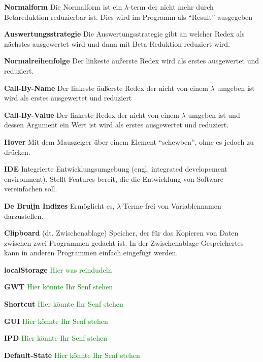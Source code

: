 \documentclass[parskip=full,11pt,twoside]{scrartcl}
\begin{document}
\textbf{Normalform}
\newline
Die Normalform ist ein $\lambda$-term der nicht mehr durch Betareduktion reduzierbar ist. Dies wird im Programm als \enquote{Result} ausgegeben

\textbf{Auswertungsstrategie}
\newline
Die Auswertungsstrategie gibt an welcher Redex als nächstes ausgewertet wird und dann mit Beta-Reduktion reduziert wird.

\textbf{Normalreihenfolge}
\newline
Der linkeste äußerste Redex wird als erstes ausgewertet und reduziert.

\textbf{Call-By-Name}
\newline
Der linkeste äußerste Redex der nicht von einem $\lambda$ umgeben ist wird als erstes ausgewertet und reduziert

\textbf{Call-By-Value}
\newline
Der linkeste Redex der nicht von einem $\lambda$ umgeben ist und dessen Argument ein Wert ist wird als erstes ausgewertet und reduziert.

\textbf{Hover}
\newline
Mit dem Mauszeiger über einem Element \enquote{schewben}, ohne es jedoch zu drücken.

\textbf{IDE}
\newline
Integrierte Entwicklungsumgebung (engl. integrated developement environment). Stellt Features bereit, die die Entwicklung von Software vereinfachen soll.

\textbf{De Bruijn Indizes}
\newline
Ermöglicht es, $\lambda$-Terme frei von Variablennamen darzustellen.

\textbf{Clipboard}
\newline
(dt. Zwischenablage) Speicher, der für das Kopieren von Daten zwischen zwei Programmen gedacht ist. In der Zwischenablage Gespeichertes kann in anderen Programmen einfach eingefügt werden.

\textbf{localStorage}
\newline
\textcolor{green}{Hier was reindudeln}

\textbf{GWT}
\newline
\textcolor{green}{Hier könnte Ihr Senf stehen}

\textbf{Shortcut}
\newline
\textcolor{green}{Hier könnte Ihr Senf stehen}

\textbf{GUI}
\newline
\textcolor{green}{Hier könnte Ihr Senf stehen}

\textbf{IPD}
\newline
\textcolor{green}{Hier könnte Ihr Senf stehen}

\textbf{Default-State}
\newline
\textcolor{green}{Hier könnte Ihr Senf stehen}
\end{document}
